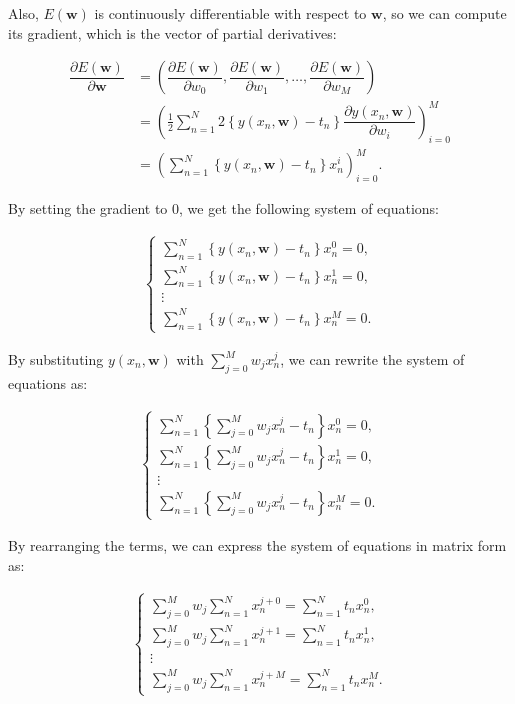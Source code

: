 \documentclass{article}
\begin{document}
\begin{tcolorbox}[breakable,colback=gray!5,colframe=gray!60,title=Solution]
Also, $E(\textbf{w})$ is continuously differentiable with respect to $\textbf{w}$, so we can compute its gradient, which is the vector of partial derivatives:

\begin{align*}
  \dfrac{\partial E(\textbf{w})}{\partial \textbf{w}} &= \left( \dfrac{\partial E(\textbf{w})}{\partial w_0}, \dfrac{\partial E(\textbf{w})}{\partial w_1}, \ldots, \dfrac{\partial E(\textbf{w})}{\partial w_M} \right) \\
  &= \left( \frac{1}{2} \sum_{n=1}^N 2 \left\{ y(x_n, \textbf{w}) - t_n \right\} \dfrac{\partial y(x_n, \textbf{w})}{\partial w_i} \right)_{i=0}^{M} \\
  &= \left( \sum_{n=1}^N \left\{ y(x_n, \textbf{w}) - t_n \right\} x_n^i \right)_{i=0}^{M}.
\end{align*}

By setting the gradient to 0, we get the following system of equations:

\begin{align*}
\begin{cases}
\sum_{n=1}^N \left\{ y(x_n, \textbf{w}) - t_n \right\} x_n^0 = 0, \\
\sum_{n=1}^N \left\{ y(x_n, \textbf{w}) - t_n \right\} x_n^1 = 0, \\
\vdots \\
\sum_{n=1}^N \left\{ y(x_n, \textbf{w}) - t_n \right\} x_n^M = 0.
\end{cases}
\end{align*}

By substituting $y(x_n, \textbf{w})$ with $\sum_{j=0}^M w_j x_n^j$, we can rewrite the system of equations as:

\begin{align*}
\begin{cases}
\sum_{n=1}^N \left\{ \sum_{j=0}^M w_j x_n^j - t_n \right\} x_n^0 = 0, \\
\sum_{n=1}^N \left\{ \sum_{j=0}^M w_j x_n^j - t_n \right\} x_n^1 = 0, \\
\vdots \\
\sum_{n=1}^N \left\{ \sum_{j=0}^M w_j x_n^j - t_n \right\} x_n^M = 0.
\end{cases}
\end{align*}

By rearranging the terms, we can express the system of equations in matrix form as:

\begin{align*}
\begin{cases}
\sum_{j=0}^M w_j \sum_{n=1}^N x_n^{j+0} = \sum_{n=1}^N t_n x_n^0, \\
\sum_{j=0}^M w_j \sum_{n=1}^N x_n^{j+1} = \sum_{n=1}^N t_n x_n^1, \\
\vdots \\
\sum_{j=0}^M w_j \sum_{n=1}^N x_n^{j+M} = \sum_{n=1}^N t_n x_n^M.
\end{cases}
\end{align*}


\end{tcolorbox}
\end{document}
